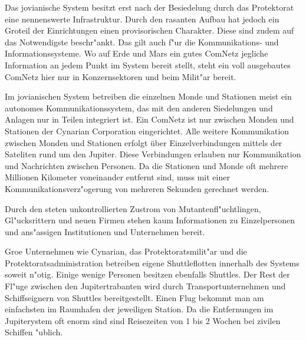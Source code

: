 
Das jovianische System besitzt erst nach der Besiedelung durch das Protektorat eine nennenswerte Infrastruktur. Durch den rasanten Aufbau hat jedoch ein Gro\3teil der Einrichtungen einen provisorischen Charakter. Diese sind zudem auf das Notwendigste beschr"ankt. Das gilt auch f"ur die Kommunikations- und Informationssysteme. Wo auf Erde und Mars ein gutes ComNetz jegliche Information an jedem Punkt im System bereit stellt, steht ein voll ausgebautes ComNetz hier nur in Konzernsektoren und beim Milit"ar bereit.

Im jovianischen System  betreiben die einzelnen Monde und Stationen meist ein autonomes Kommunikationssystem, das mit den anderen Siedelungen und Anlagen nur in Teilen integriert ist. Ein ComNetz ist nur zwischen Monden und Stationen der Cynarian Corporation eingerichtet. Alle weitere Kommunikation zwischen Monden und Stationen erfolgt über Einzelverbindungen mittels der Sateliten rund um den Jupiter. Diese Verbindungen erlauben nur Kommunikation und Nachrichten zwischen Personen. Da die Stationen und Monde oft mehrere Millionen Kilometer voneinander entfernt sind, muss mit einer Kommunikationsverz"ogerung von mehreren Sekunden gerechnet werden.

Durch den steten unkontrollierten Zustrom von Mutantenfl"uchtlingen, Gl"ucksrittern und neuen Firmen stehen kaum Informationen zu Einzelpersonen und ans"assigen Institutionen und Unternehmen bereit.


Gro\3e Unternehmen wie Cynarian, das Protektoratsmilit"ar und die Protektoratsadministration betreiben eigene Shuttleflotten innerhalb des Systems soweit n"otig. Einige wenige Personen besitzen ebenfalls Shuttles. Der Rest der Fl"uge zwischen den Jupitertrabanten wird durch Transportunternehmen und Schiffseignern von Shuttles bereitgestellt. Einen Flug bekommt man am einfachsten im Raumhafen der jeweiligen Station. Da die Entfernungen im Jupiterystem oft enorm sind sind Reisezeiten von 1 bis 2 Wochen bei zivilen Schiffen "ublich.
